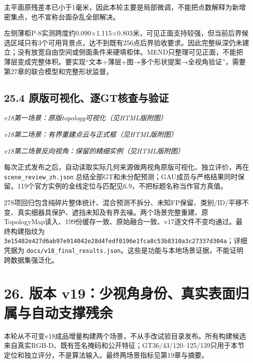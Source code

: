 \documentclass[UTF8,fontset=fandol]{ctexart}
\begin{document}
主平面原残差本已小于1毫米，因此本轮主要是局部微调，不能把点数解释为新增密集点，也不宣称台面杂乱全部解决。



左侧薄柜P-8实测跨度约0.090×1.115×0.803米，可见正面支持较强，但当前后界候选区域只有3个可用背景点，达不到既有256点后界验收要求。因此完整纵深仍未建立；没有放宽自由空间或侧面条件来硬填柜体。MEND只整理可见正面，不能把薄层变成完整体积。要实现“文本+薄层+图→多个形状提案→全视角验证”，需要第27章的联合模型和完整形状监督。



\subsection*{25.4 原版可视化、逐GT核查与验证}

\textit{v18第一场景：原版topology可视化（见HTML版附图）}



\textit{v18第二场景：有界重建点云与正式框（见HTML版附图）}



\textit{v18第二场景反向视角：保留的精细实例（见HTML版附图）}



每次正式发布之后，自动读取实际几何来源做两视角原版可视化、独立评价，再在 \texttt{scene\_\allowbreak{}review\_\allowbreak{}zh.\allowbreak{}json} 总结全部GT和未分配预测；GAU成员与严格结果同时保留。119个官方实例的金线定位与匹配见6.9，不把标题名称当作官方真值。



278项回归包含纯碎片整体统计、混合预测不拆分、未知FP保留、类别/ID/平移不变、真实细器具保护、遮挡未知及有界去噪。两个场景完整重建、原TopologyMap读入、199份缓存一致、原始融合一致、v17逐文件不变均通过。最终构建指纹为 \texttt{3e15482e427d6ab97e914042e28d4fedf0196e1fca8c53b8310a3c27337d304a}；详细凭据为 \texttt{docs/\allowbreak{}v18\_\allowbreak{}final\_\allowbreak{}results.\allowbreak{}json}。这些是功能与本地场景证据，不能证明跨数据集强泛化。



\section*{26. 版本 v19：少视角身份、真实表面归属与自动支撑残余}

本轮从不可变v18成品增量构建两个场景，不从手改试验目录发布。所有构建候选来自真实RGB-D、既有签名掩码和公开特征；GT36/43/120–125/139只用于本节定位和独立评分，不是算法输入。最终两场景指标见第19章与摘要。
\end{document}
